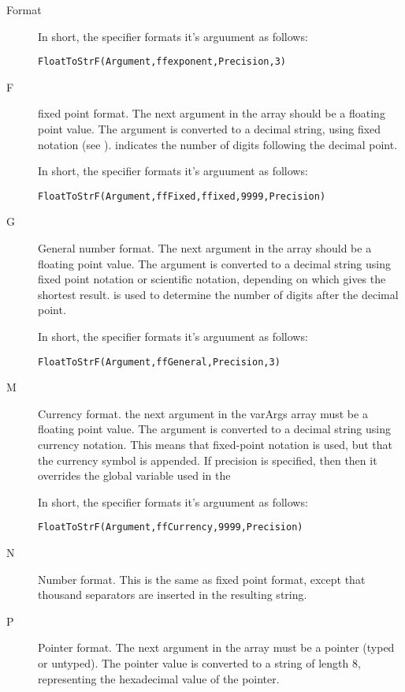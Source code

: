 \begin{function}{Format}
\begin{description}
In short, the  specifier formats it's arguument as follows:
\begin{verbatim}
FloatToStrF(Argument,ffexponent,Precision,3)
\end{verbatim}

\item[F] fixed point format. The next argument in the  array
should be a floating point value. The argument is converted to a
decimal string, using fixed notation (see ).
 indicates the number of digits following the
decimal point.

In short, the  specifier formats it's arguument as follows:
\begin{verbatim}
FloatToStrF(Argument,ffFixed,ffixed,9999,Precision)
\end{verbatim}

\item[G] General number format. The next argument in the  array
should be a floating point value. The argument is converted to a decimal
string using fixed point notation or scientific notation, depending on which
gives the shortest result.  is used to determine the number
of digits after the decimal point.

In short, the  specifier formats it's arguument as follows:
\begin{verbatim}
FloatToStrF(Argument,ffGeneral,Precision,3)
\end{verbatim}

\item[M] Currency format. the next argument in the var{Args} array must
be a floating point value. The argument is converted to a decimal string
using currency notation. This means that fixed-point notation is used, but
that the currency symbol is appended. If precision is specified, then
then it overrides the  global variable used in the

In short, the  specifier formats it's arguument as follows:
\begin{verbatim}
FloatToStrF(Argument,ffCurrency,9999,Precision)
\end{verbatim}

\item[N] Number format. This is the same as fixed point format, except that
thousand separators are inserted in the resulting string.

\item[P] Pointer format. The next argument in the  array must be a
pointer (typed or untyped). The pointer value is converted to a string of
length 8, representing the hexadecimal value of the pointer.


\end{description}
\end{function}
